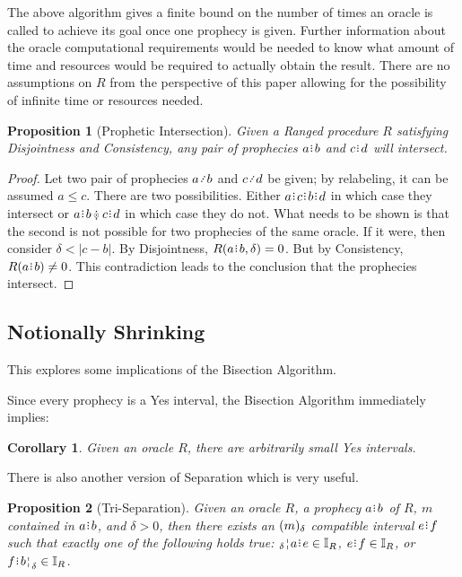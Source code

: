 \documentclass[12pt]{article}
\newtheorem{corollary}{Corollary}[section]
\newtheorem{proposition}{Proposition}[section]
\begin{document}
The above algorithm gives a finite bound on the number of times an oracle is called to achieve its goal once one prophecy is given. Further information about the oracle computational requirements would be needed to know what amount of time and resources would be required to actually obtain the result. There are no assumptions on $R$ from the perspective of this paper allowing for the possibility of infinite time or resources needed. 

\begin{proposition}[Prophetic Intersection]\label{os-prointer}
     Given a Ranged procedure $R$ satisfying Disjointness and Consistency, any pair of prophecies $a\rint b$ and $c\rint d$ will intersect. 
\end{proposition}

\begin{proof}
    Let two pair of prophecies $a \lte b$ and $c \lte d$ be given; by relabeling, it can be assumed $a \leq c$. There are two possibilities. Either $a \rint  c \rint  b\rint  d$ in which case they intersect or $a\rint b\betneq c\rint  d$ in which case they do not. What needs to be shown is that the second is not possible for two prophecies of the same oracle. If it were, then consider $\delta < |c-b|$. By Disjointness, $R(a\rint b, \delta) = 0$. But by Consistency,  $R(a\rint b) \neq 0$. This contradiction leads to the conclusion that the prophecies intersect. 
\end{proof}


\subsection{Notionally Shrinking}


This explores some implications of the Bisection Algorithm. 

Since every prophecy is a Yes interval, the Bisection Algorithm immediately implies: 
\begin{corollary}
    Given an oracle $R$, there are arbitrarily small Yes intervals. 
\end{corollary}

There is also another version of Separation which is very useful. 

\begin{proposition}[Tri-Separation]
    Given an oracle $R$, a prophecy $a\rint b$ of $R$, $m$ contained in $a\rint b$, and $\delta > 0$, then there exists an $(m)_{\delta}$ compatible interval $e\rint f$ such that exactly one of the following holds true:   $\fuzbleft{a}\rint e \in \mathbb{I}_R$, $e\rint f \in \mathbb{I}_R$,  or $f\rint \fuzbright{b} \in \mathbb{I}_R$.
\end{proposition}
\end{document}
